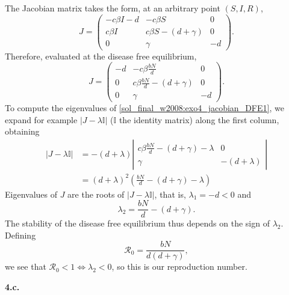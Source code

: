 \documentclass[12pt]{article}
\theoremstyle{plain}
\def\II{\mathbb{I}}
\def\Rzero{\mathcal{R}_0}
\begin{document}
The Jacobian matrix takes the form, at an arbitrary point $(S,I,R)$,
\begin{equation}\label{sol_final_w2008:exo4_jacobian}
J=\begin{pmatrix}
-c\beta I-d & -c\beta S & 0 \\
c\beta I & c\beta S-(d+\gamma) & 0 \\
0 & \gamma & -d
\end{pmatrix}.
\end{equation}
Therefore, evaluated at the disease free equilibrium,
\begin{equation}\label{sol_final_w2008:exo4_jacobian_DFE1}
J=\begin{pmatrix}
-d & -c\beta\frac{bN}{d} & 0 \\
0 & c\beta \frac{bN}{d}-(d+\gamma) & 0 \\
0 & \gamma & -d
\end{pmatrix}.
\end{equation}
To compute the eigenvalues of \eqref{sol_final_w2008:exo4_jacobian_DFE1}, we expand for example $|J-\lambda\II|$ ($\II$ the identity matrix) along the first column, obtaining
\begin{align*}
|J-\lambda\II| &=
-(d+\lambda)
\left|
\begin{matrix}
c\beta \frac{bN}{d}-(d+\gamma)-\lambda & 0 \\
\gamma & -(d+\lambda)
\end{matrix}
\right| \\
&= (d+\lambda)^2\left(\frac{bN}{d}-(d+\gamma)-\lambda\right)
\end{align*}
Eigenvalues of $J$ are the roots of $|J-\lambda\II|$, that is, $\lambda_1=-d<0$ and
\[
\lambda_2=\frac{bN}{d}-(d+\gamma).
\]
The stability of the disease free equilibrium thus depends on the sign of $\lambda_2$. Defining
\[
\Rzero=\frac{bN}{d(d+\gamma)},
\]
we see that $\Rzero<1\Leftrightarrow \lambda_2<0$, so this is our reproduction number.


\textbf{4.c.}
\end{document}
